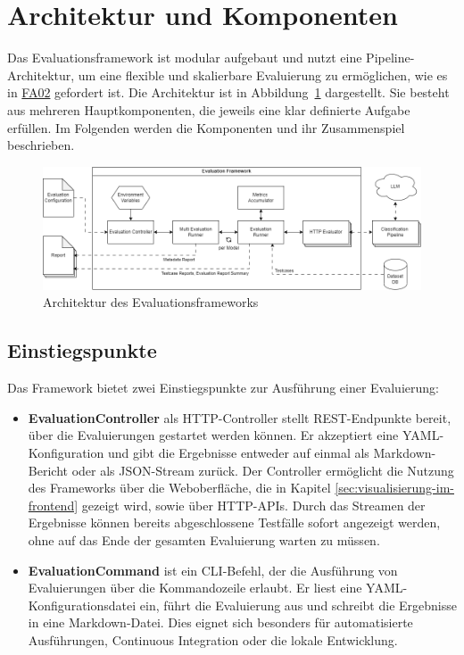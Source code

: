 \section{Architektur und Komponenten}\label{sec:architektur-und-komponenten}

Das Evaluationsframework ist modular aufgebaut und nutzt eine Pipeline-Architektur, um eine flexible und skalierbare Evaluierung zu ermöglichen, wie es in \hyperlink{FA02}{FA02} gefordert ist. Die Architektur ist in Abbildung~\ref{fig:evaluation-framework-architecture} dargestellt. Sie besteht aus mehreren Hauptkomponenten, die jeweils eine klar definierte Aufgabe erfüllen. Im Folgenden werden die Komponenten und ihr Zusammenspiel beschrieben.

\begin{figure}
    \centering
    \includegraphics[width=\linewidth]{images/evaluation/evaluation-framework-architecture.drawio}
    \caption{Architektur des Evaluationsframeworks}
    \label{fig:evaluation-framework-architecture}
\end{figure}

\subsection*{Einstiegspunkte}

Das Framework bietet zwei Einstiegspunkte zur Ausführung einer Evaluierung:

\begin{itemize}
    \item \textbf{EvaluationController} als HTTP-Controller stellt REST-Endpunkte bereit, über die Evaluierungen gestartet werden können. Er akzeptiert eine YAML-Konfiguration und gibt die Ergebnisse entweder auf einmal als Markdown-Bericht oder als JSON-Stream zurück. Der Controller ermöglicht die Nutzung des Frameworks über die Weboberfläche, die in Kapitel \ref{sec:visualisierung-im-frontend} gezeigt wird, sowie über HTTP-APIs. Durch das Streamen der Ergebnisse können bereits abgeschlossene Testfälle sofort angezeigt werden, ohne auf das Ende der gesamten Evaluierung warten zu müssen.
    \item \textbf{EvaluationCommand} ist ein CLI-Befehl, der die Ausführung von Evaluierungen über die Kommandozeile erlaubt. Er liest eine YAML-Konfigurationsdatei ein, führt die Evaluierung aus und schreibt die Ergebnisse in eine Markdown-Datei. Dies eignet sich besonders für automatisierte Ausführungen, Continuous Integration oder die lokale Entwicklung.
\end{itemize}


